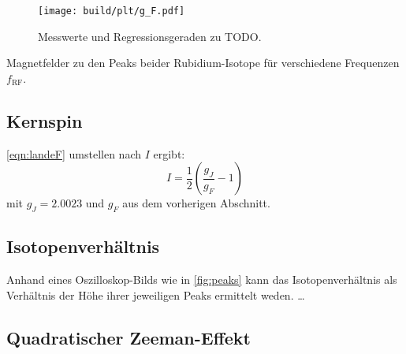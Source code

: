 \begin{figure}
    \centering
    \texttt{[image: build/plt/g\_F.pdf]}
    \caption{Messwerte und Regressionsgeraden zu TODO.}
    \label{fig:plt:g_F}
\end{figure}

\begin{table}
    \centering
    \caption{Magnetfelder zu den Peaks beider Rubidium-Isotope für verschiedene Frequenzen $f_\text{RF}$.}
    \label{tab:mess}
\end{table}



\subsection{Kernspin}


\autoref{eqn:landeF} umstellen nach $I$ ergibt:
\[
    I = \frac{1}{2} \left( \frac{g_J}{g_F} - 1 \right)
\]
mit $g_J = \num{2.0023}$ und $g_F$ aus dem vorherigen Abschnitt.


\subsection{Isotopenverhältnis}
Anhand eines Oszilloskop-Bilds wie in \autoref{fig:peaks} kann das Isotopenverhältnis
als Verhältnis der Höhe ihrer jeweiligen Peaks ermittelt weden.
…


\subsection{Quadratischer Zeeman-Effekt}
